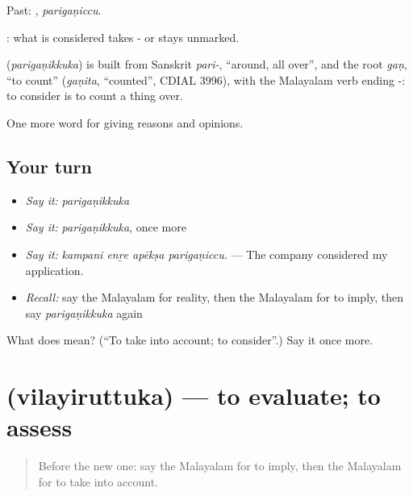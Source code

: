 Past: , \emph{parigaṇiccu}.

 : what is considered takes - or stays unmarked.

\begin{cousinweb}
\textbf{} (\emph{parigaṇikkuka}) is built from Sanskrit \emph{pari-}, \textquotedblleft{}around, all over\textquotedblright{}, and the root \emph{gaṇ}, \textquotedblleft{}to count\textquotedblright{} (\emph{gaṇita}, \textquotedblleft{}counted\textquotedblright{}, CDIAL 3996), with the Malayalam verb ending -: to consider is to count a thing over.
\end{cousinweb}

\begin{grammarlens}[title={What you've built}]
One more word for giving reasons and opinions.
\end{grammarlens}

\subsection*{Your turn}
\begin{itemize}
\raggedright
  \item \emph{Say it:} \emph{parigaṇikkuka}
  \item \emph{Say it:} \emph{parigaṇikkuka}, once more
  \item \emph{Say it:} \emph{kampani enṟe apēkṣa parigaṇiccu.} — The company considered my application.
  \item \emph{Recall:} say the Malayalam for reality, then the Malayalam for to imply, then say \emph{parigaṇikkuka} again
\end{itemize}

\begin{tcolorbox}[breakable,colback=teal!4,colframe=teal!35!black,title={Before you move on}]
What does  mean? (\textquotedblleft{}To take into account; to consider\textquotedblright{}.) Say it once more.
\end{tcolorbox}
\section[\texorpdfstring{\ml{വിലയിരുത്തുക} (vilayiruttuka)}{വിലയിരുത്തുക (vilayiruttuka)}]{ (vilayiruttuka) — to evaluate; to assess}

\label{lesson:ML-C408-vilayiruttuka}



\begin{quote}
Before the new one: say the Malayalam for to imply, then the Malayalam for to take into account.
\end{quote}

